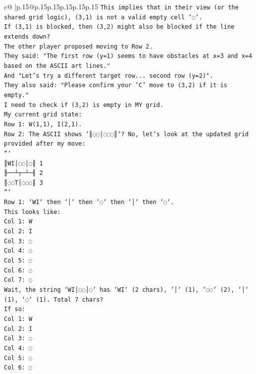 \documentclass{article}
\begin{document}
{\begin{supertabular}{c@{$\;$}|p{.15\linewidth}@{}p{.15\linewidth}p{.15\linewidth}p{.15\linewidth}p{.15\linewidth}p{.15\linewidth}}
{{{\texttt{This implies that in their view (or the shared grid logic), (3,1) is not a valid empty cell `◌`.} \\
\texttt{If (3,1) is blocked, then (3,2) might also be blocked if the line extends down?} \\
\texttt{The other player proposed moving to Row 2.} \\
\texttt{They said: "The first row (y=1) seems to have obstacles at x=3 and x=4 based on the ASCII art lines."} \\
\texttt{And "Let's try a different target row... second row (y=2)".} \\
\texttt{They also said: "Please confirm your 'C' move to (3,2) if it is empty."} \\
\texttt{I need to check if (3,2) is empty in MY grid.} \\
\texttt{My current grid state:} \\
\texttt{Row 1: W(1,1), I(2,1).} \\
\texttt{Row 2: The ASCII shows `║◌◌│◌◌◌║`? No, let's look at the updated grid provided after my move:} \\
\texttt{```} \\
\texttt{║WI│◌◌│◌║ 1} \\
\texttt{╟──┴┬─┴─╢ 2} \\
\texttt{║◌◌T│◌◌◌║ 3} \\
\texttt{```} \\
\texttt{Row 1: `WI` then `│` then `◌` then `│` then `◌`.} \\
\texttt{This looks like:} \\
\texttt{Col 1: W} \\
\texttt{Col 2: I} \\
\texttt{Col 3: ◌} \\
\texttt{Col 4: ◌} \\
\texttt{Col 5: ◌} \\
\texttt{Col 6: ◌} \\
\texttt{Col 7: ◌} \\
\texttt{Wait, the string `WI│◌◌│◌` has `WI` (2 chars), `│` (1), `◌◌` (2), `│` (1), `◌` (1). Total 7 chars?} \\
\texttt{If so:} \\
\texttt{Col 1: W} \\
\texttt{Col 2: I} \\
\texttt{Col 3: ◌} \\
\texttt{Col 4: ◌} \\
\texttt{Col 5: ◌} \\
\texttt{Col 6: ◌} \\
}}}
\end{supertabular}}
\end{document}
